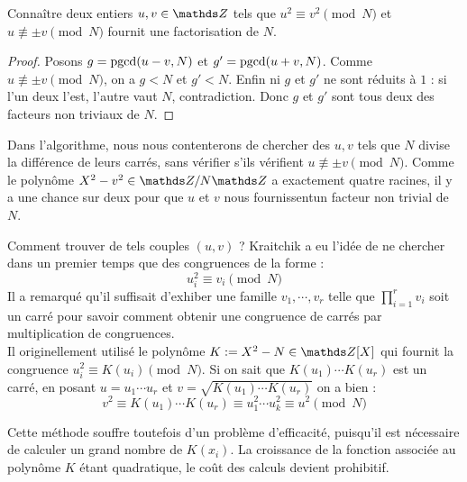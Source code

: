 \begin{lemme}
	Connaître deux entiers $u, v \in \Z$ tels que $u^2 \equiv v^2 
	\pmod{N}$ et $u\not\equiv \pm v\pmod{N}$ fournit une factorisation de $N$.
\end{lemme}

\begin{proof}
	Posons $g =\operatorname{pgcd}(u-v, N)$ et $g' = \operatorname{pgcd}(u+v, N)$. Comme $u\not\equiv \pm
	v\pmod{N}$, on a $g<N$ et $g'<N$. Enfin ni $g$ et $g'$ ne sont réduits à
	$1$ : si l'un deux l'est, l'autre vaut $N$, contradiction. Donc $g$ et $g'$
	sont tous deux des facteurs non triviaux de $N$.
\end{proof}

\begin{remarque}
	Dans l'algorithme, nous nous contenterons de chercher des $u, v$ tels que
	$N$ divise la différence de leurs carrés, sans vérifier s'ils vérifient $u
	\not\equiv \pm v\pmod{N}$. Comme le polynôme $X^2 - v^2 \in \Z/N\Z$ a
	exactement quatre racines, il y a \og{} une chance sur deux \fg  pour que
	$u$ et $v$ nous fournissentun facteur non trivial de $N$. \\
\end{remarque}

Comment trouver de tels couples $(u, v)$ ? Kraitchik a eu l'idée de ne chercher
dans un premier temps que des congruences de la forme : \[u_i^2 \equiv v_i 
\pmod{N}\] Il a remarqué qu'il suffisait d'exhiber une famille $v_1, \cdots,
v_r$ telle que $\prod_{i=1}^r v_i$ soit un carré pour savoir comment obtenir 
une congruence de carrés par multiplication de congruences. \\

Il originellement utilisé le polynôme $K := X^2 - N \in \Z[X]$ qui fournit la
congruence $u_i^2 \equiv K(u_i) \pmod{N}$. Si on sait que  $K(u_1)\cdots K(u_r)$ 
est un carré, en posant $u = u_1\cdots u_r$ et $v = \sqrt{ K(u_1)\cdots K(u_r)}$ 
on a bien :
\[v^2 \equiv K(u_1)\cdots K(u_r) \equiv u_1^2 \cdots u_k^2 \equiv u^2\pmod{N}\]

Cette méthode souffre toutefois d'un problème d'efficacité, puisqu'il est nécessaire 
de calculer un grand nombre de $K(x_i)$. La croissance de la fonction associée 
au polynôme $K$ étant quadratique, le coût des calculs devient prohibitif.\\


